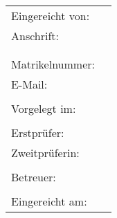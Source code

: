\begin{titlepage}
	\sffamily

	\vspace{2.5cm}

	\begin{center}
		\huge{\thesistitle}

		\vspace{3cm}

		\renewcommand{\baselinestretch}{1.3}
		\Large{\thesistype}

		\large
		\thesistypedesc
	\end{center}

	\vspace{1.5cm}
	\renewcommand{\baselinestretch}{1}
	\begin{table}[htpb]
		\centering
		\begin{tabular}{ll}
			\\
			Eingereicht von: & \thesisauthorname \\
			Anschrift: & \thesisauthorhomestreet \\
			& \thesisauthorhometown \\
			\\
			Matrikelnummer: & \thesisauthormatrikelnumber \\
			E-Mail: & \thesisauthoremail \\
			\\
			Vorgelegt im: & \thesisdepartment \\
			\\
			Erstprüfer: & \thesisfirstreviewer \\
			Zweitprüferin: & \thesissecondreviewer \\
			\\
			Betreuer: & \thesissupervisor \\
			\\
			Eingereicht am: & \thesisdate \\
		\end{tabular}
	\end{table}

	\rmfamily
\end{titlepage}
